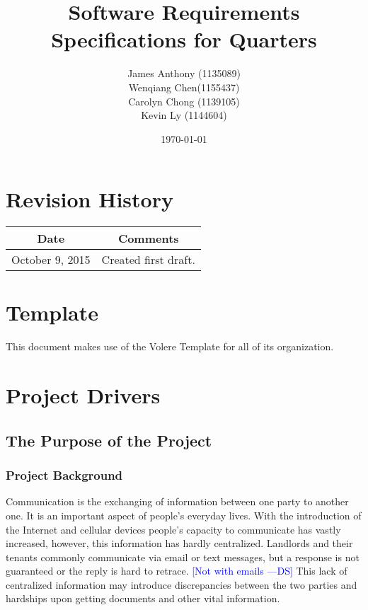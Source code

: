 \documentclass[12pt, titlepage]{article}
\newcommand{\authornote}[3]{\textcolor{#1}{[#3 ---#2]}}
\newcommand{\authornote}[3]{}
\newcommand{\ds}[1]{\authornote{blue}{DS}{#1}}
\begin{document}
\title{Software Requirements Specifications for Quarters} 
\author{James Anthony (1135089)\\ Wenqiang Chen(1155437)\\ Carolyn Chong 
(1139105)\\ Kevin Ly (1144604)}
\date{\today}
\maketitle

\tableofcontents 
\listoffigures
\listoftables

\section*{Revision History}
\begin{tabular}{|c|c|}
\hline
\textbf{Date}  & \textbf{Comments} \\ \hline
October 9, 2015 & Created first draft. \\ 
\hline
\end{tabular}

\section*{Template}
This document makes use of the Volere Template for all of its organization.

\pagebreak

\section{Project Drivers}
\subsection{The Purpose of the Project}
\subsubsection{Project Background}
Communication is the exchanging of information between one party to another 
one. It is an important aspect of people's everyday lives. With the introduction 
of the Internet and cellular devices people's capacity to communicate has vastly 
increased, however, this information has hardly centralized. Landlords and their 
tenants commonly communicate via email or text messages, but a response is not 
guaranteed or the reply is hard to retrace. \ds{Not with emails} This lack of centralized 
information may introduce discrepancies between the two parties and hardships 
upon getting documents and other vital information.\\
\end{document}
